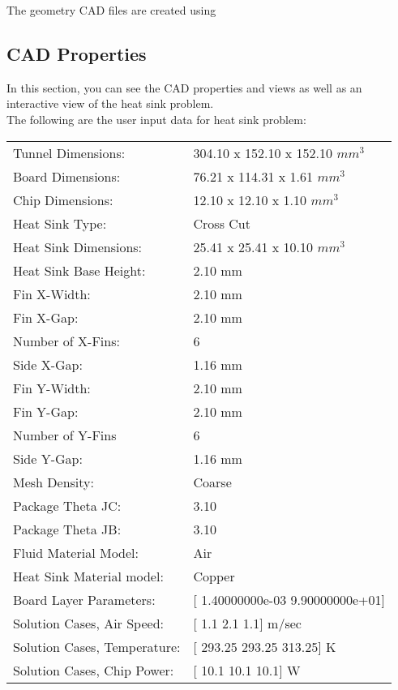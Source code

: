 \documentclass[letterpaper,12pt]{article}
\begin{document}
The geometry CAD files are created using 
\\
\subsection{CAD Properties}

In this section, you can see the CAD
properties and views as well as an interactive view of
the heat sink problem.
\\
The following are the user input data for heat sink problem:\\
\begin{flushleft}
\begin{tabular}{ l l }
Tunnel Dimensions: & 304.10 x 152.10 x 152.10 $mm^3$ \\
Board Dimensions: & 76.21 x 114.31 x 1.61 $mm^3$ \\
Chip Dimensions: & 12.10 x 12.10 x 1.10 $mm^3$ \\
Heat Sink Type: & Cross Cut \\
Heat Sink Dimensions: & 25.41 x 25.41 x 10.10 $mm^3$ \\
Heat Sink Base Height: & 2.10 mm \\
Fin X-Width: & 2.10 mm \\
Fin X-Gap: & 2.10 mm \\
Number of X-Fins: & 6 \\
Side X-Gap: & 1.16 mm \\
Fin Y-Width: & 2.10 mm \\
Fin Y-Gap: & 2.10 mm \\
Number of Y-Fins & 6 \\
Side Y-Gap: & 1.16 mm \\
Mesh Density: & Coarse \\
Package Theta JC: & 3.10  \\
Package Theta JB: & 3.10  \\
Fluid Material Model: & Air  \\
Heat Sink Material model: & Copper  \\
Board Layer Parameters: & [  1.40000000e-03   9.90000000e+01]  \\
Solution Cases, Air Speed: & [ 1.1  2.1  1.1] m/sec \\
Solution Cases, Temperature: & [ 293.25  293.25  313.25] K \\
Solution Cases, Chip Power: & [ 10.1  10.1  10.1] W \\
\end{tabular}
\end{flushleft}
\vfill
\newpage
\clearpage
\end{document}
